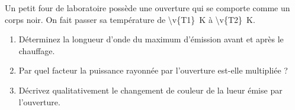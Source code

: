 Un petit four de laboratoire possède une ouverture qui se comporte comme un corps noir. On fait passer sa température de \qty{\v{T1}}{K} à \qty{\v{T2}}{K}.

\begin{enumerate}[label=\alph*)]
    \item Déterminez la longueur d'onde du maximum d'émission avant et après le chauffage.
    \item Par quel facteur la puissance rayonnée par l'ouverture est-elle multipliée ?
    \item Décrivez qualitativement le changement de couleur de la lueur émise par l'ouverture.
\end{enumerate}
